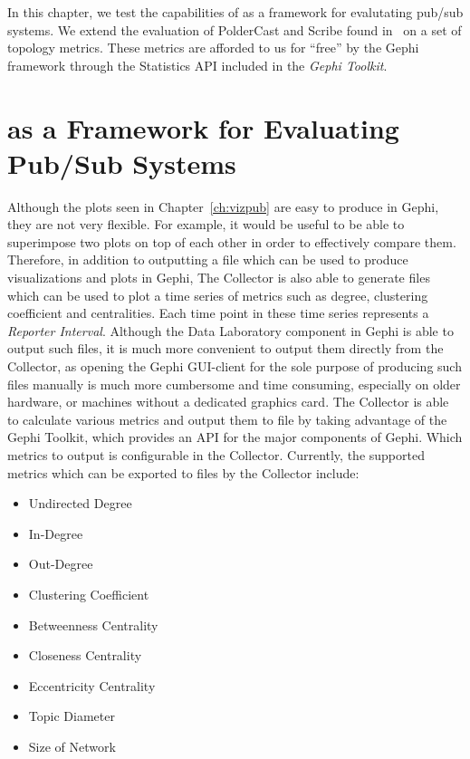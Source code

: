 In this chapter, we test the capabilities of  \demo{} as a framework for
evalutating pub/sub systems. We extend the evaluation of PolderCast and
Scribe found in~\cite{Setty:2012} on a set of topology metrics. These
metrics are afforded to us for ``free'' by the Gephi framework through
the Statistics API included in the \emph{Gephi Toolkit}.

\section{\demo as a Framework for Evaluating Pub/Sub Systems}
\label{sec:viz_eval}

Although the plots seen in Chapter~\ref{ch:vizpub} are easy to produce
in Gephi, they are not very flexible. For example, it would be useful to
be able to superimpose two plots on top of each other in order to
effectively compare them. Therefore, in addition to outputting a \gexf
file which can be used to produce visualizations and plots in Gephi, The
Collector is also able to generate \csv files which can be used to plot
a time series of metrics such as degree, clustering coefficient and
centralities. Each time point in these time series represents a
\emph{Reporter Interval}. Although the Data Laboratory component in
Gephi is able to output such \csv files, it is much more convenient to
output them directly from the Collector, as opening the Gephi GUI-client
for the sole purpose of producing such files manually is much more
cumbersome and time consuming, especially on older hardware, or machines
without a dedicated graphics card. The Collector is able to calculate
various metrics and output them to file by taking advantage of the Gephi
Toolkit, which provides an API for the major components of Gephi. Which
metrics to output is configurable in the Collector. Currently, the
supported metrics which can be exported to \csv files by the Collector
include:

\begin{itemize}
    \item Undirected Degree
    \item In-Degree
    \item Out-Degree
    \item Clustering Coefficient
    \item Betweenness Centrality
    \item Closeness Centrality
    \item Eccentricity Centrality
    \item Topic Diameter
    \item Size of Network
\end{itemize}

